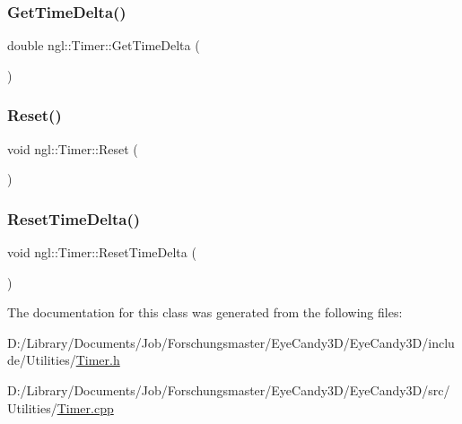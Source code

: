 \mbox{\label{classngl_1_1_timer_a73e8e6aec1d10601a0e027a8d27732ca}} 
\subsubsection{\texorpdfstring{Get\+Time\+Delta()}{GetTimeDelta()}}
{\footnotesize\ttfamily double ngl\+::\+Timer\+::\+Get\+Time\+Delta (\begin{DoxyParamCaption}{ }\end{DoxyParamCaption})}

\mbox{\label{classngl_1_1_timer_a119e94535c7ecba9ed6d823c5facd418}} 
\subsubsection{\texorpdfstring{Reset()}{Reset()}}
{\footnotesize\ttfamily void ngl\+::\+Timer\+::\+Reset (\begin{DoxyParamCaption}{ }\end{DoxyParamCaption})}

\mbox{\label{classngl_1_1_timer_afb2c809f08d064f89e0ef2e96a151c3b}} 
\subsubsection{\texorpdfstring{Reset\+Time\+Delta()}{ResetTimeDelta()}}
{\footnotesize\ttfamily void ngl\+::\+Timer\+::\+Reset\+Time\+Delta (\begin{DoxyParamCaption}{ }\end{DoxyParamCaption})}



The documentation for this class was generated from the following files\+:\begin{DoxyCompactItemize}
\item 
D\+:/\+Library/\+Documents/\+Job/\+Forschungsmaster/\+Eye\+Candy3\+D/\+Eye\+Candy3\+D/include/\+Utilities/\mbox{\hyperlink{_timer_8h}{Timer.\+h}}\item 
D\+:/\+Library/\+Documents/\+Job/\+Forschungsmaster/\+Eye\+Candy3\+D/\+Eye\+Candy3\+D/src/\+Utilities/\mbox{\hyperlink{_timer_8cpp}{Timer.\+cpp}}\end{DoxyCompactItemize}
